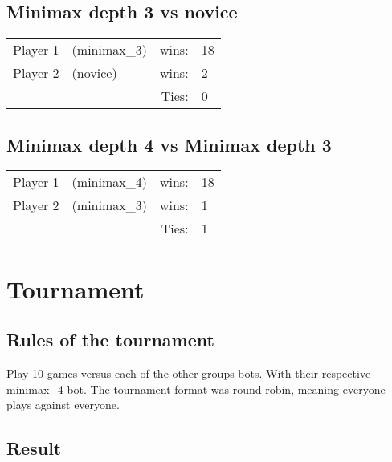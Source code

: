 \documentclass[12pt, a4paper]{article}
\begin{document}
\subsection{Minimax depth 3 vs novice}
  \begin{tabular}{| l  l  r l |}
    \hline
 	Player 1 & (minimax\_3) & wins: & 18 \\
 	Player 2 & (novice) & wins: & 2 \\
 	& &  Ties: & 0 \\
    \hline
  \end{tabular}


\subsection{Minimax depth 4 vs Minimax depth 3}
  \begin{tabular}{| l  l  r l |}
    \hline
 	Player 1 & (minimax\_4) & wins: & 18 \\
 	Player 2 & (minimax\_3) & wins: & 1 \\
 	& &  Ties: & 1 \\
    \hline
  \end{tabular}

\section{Tournament}

\subsection{Rules of the tournament}
Play 10 games versus each of the other groups bots. With their respective minimax\_4 bot. The tournament format was round robin, meaning everyone plays against everyone. 

\subsection{Result}
\end{document}

